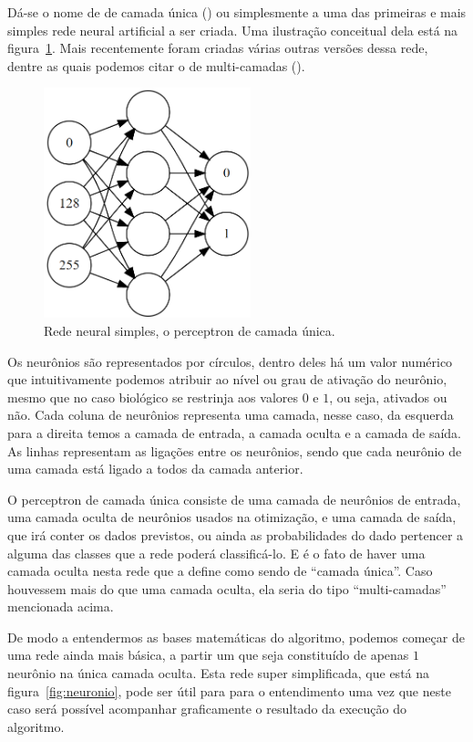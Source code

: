 Dá-se o nome de  de camada única () ou simplesmente  a uma das primeiras e mais simples rede neural artificial a ser criada. Uma ilustração conceitual dela está na figura~\ref{fig:perceptron}. Mais recentemente foram criadas várias outras versões dessa rede, dentre as quais podemos citar o  de multi-camadas (). 

\begin{figure}[htb]
\centering
\includegraphics[width=6cm]{figuras/perceptron}
\caption{Rede neural simples, o perceptron de camada única.}
\label{fig:perceptron}
\end{figure}

Os neurônios são representados por círculos, dentro deles há um valor numérico que intuitivamente podemos atribuir ao nível ou grau de ativação do neurônio, mesmo que no caso biológico se restrinja aos valores $0$ e $1$, ou seja, ativados ou não. Cada coluna de neurônios representa uma camada, nesse caso, da esquerda para a direita temos a camada de entrada, a camada oculta e a camada de saída. As linhas representam as ligações entre os neurônios, sendo que cada neurônio de uma camada está ligado a todos da camada anterior.

O perceptron de camada única consiste de uma camada de neurônios de entrada, uma camada oculta de neurônios usados na otimização, e uma camada de saída, que irá conter os dados previstos, ou ainda as probabilidades do dado pertencer a alguma das classes que a rede poderá classificá-lo. E é o fato de haver uma camada oculta nesta rede que a define como sendo de ``camada única''. Caso houvessem mais do que uma camada oculta, ela seria do tipo ``multi-camadas'' mencionada acima.

De modo a entendermos as bases matemáticas do algoritmo, podemos começar de uma rede ainda mais básica, a partir um  que seja constituído de apenas $1$ neurônio na única camada oculta. Esta rede super simplificada, que está na figura~\ref{fig:neuronio}, pode ser útil para para o entendimento uma vez que neste caso será possível acompanhar graficamente o resultado da execução do algoritmo.

